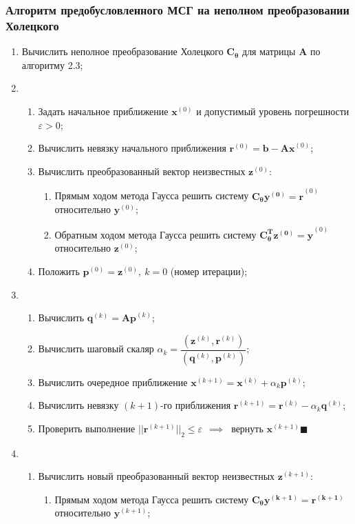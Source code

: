 \subsubsection{Алгоритм предобусловленного МСГ на неполном преобразовании Холецкого}
\begin{enumerate}
    \item Вычислить неполное преобразование Холецкого $\mathbf{C_\theta}$ для матрицы $\mathbf{A}$ по алгоритму 2.3;

    \item \begin{enumerate}
        \item Задать начальное приближение $\mathbf{x}^{(0)}$ и допустимый уровень погрешности $\varepsilon>0$;
        \item Вычислить невязку начального приближения $\mathbf{r}^{(0)}=\mathbf{b-Ax}^{(0)}$;

        \item Вычислить преобразованный вектор неизвестных $\mathbf{z}^{(0)}$:
        \begin{enumerate}
            \item Прямым ходом метода Гаусса решить систему $\mathbf{C_\theta y^{(0)} = r}^{(0)}$ относительно $\mathbf{y}^{(0)}$;

            \item Обратным ходом метода Гаусса решить систему $\mathbf{C_\theta^T z^{(0)} = y}^{(0)}$ относительно $\mathbf{z}^{(0)}$;
        \end{enumerate}

        \item Положить $\mathbf{p}^{(0)}=\mathbf{z}^{(0)},~k=0$ (номер итерации);
    \end{enumerate}
    \item \begin{enumerate}
        \item Вычислить $\mathbf{q}^{(k)}=\mathbf{Ap}^{(k)}$;
        \item Вычислить шаговый скаляр $\alpha_k=\dfrac{(\mathbf{z}^{(k)}, \mathbf{r}^{(k)})}{(\mathbf{q}^{(k)}, \mathbf{p}^{(k)})}$;
        \item Вычислить очередное приближение $\mathbf{x}^{(k+1)}=\mathbf{x}^{(k)}+\alpha_k\mathbf{p}^{(k)}$;
        \item Вычислить невязку $(k+1)$-го приближения $\mathbf{r}^{(k+1)}=\mathbf{r}^{(k)}-\alpha_k\mathbf{q}^{(k)}$;
        \item Проверить выполнение $||\mathbf{r}^{(k+1)}||_2 \le \varepsilon ~~\implies ~$ вернуть $\mathbf{x}^{(k+1)} \blacksquare$
    \end{enumerate}
    \item \begin{enumerate}
        \item Вычислить новый преобразованный вектор неизвестных $\mathbf{z}^{(k+1)}$:
        \begin{enumerate}
            \item Прямым ходом метода Гаусса решить систему $\mathbf{C_\theta y^{(k+1)} = r^{(k+1)}}$ относительно $\mathbf{y}^{(k+1)}$;


\end{enumerate}
\end{enumerate}
\end{enumerate}
